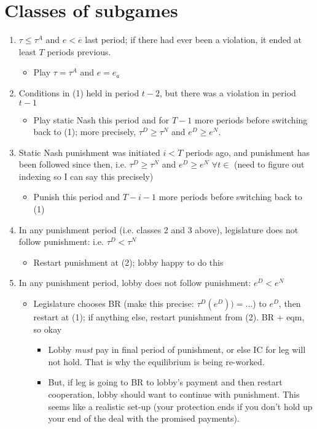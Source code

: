 \documentclass[12pt]{article}
\newcommand{\ov}{\overline}
\begin{document}
\section{Classes of subgames}
\begin{enumerate}
	\item $\tau \leq \tau^A$ and $e < \ov{e}$ last period; if there had ever been a violation, it ended at least $T$ periods previous.
		\begin{itemize}
			\item Play $\tau = \tau^A$ and $e=e_a$
		\end{itemize}
	\item Conditions in (1) held in period $t-2$, but there was a violation in period $t-1$
		\begin{itemize}
			\item Play static Nash this period and for $T-1$ more periods before switching back to (1); more precisely, $\tau^D \geq \tau^N$ and $e^D \geq e^N$.
		\end{itemize}
	\item Static Nash punishment was initiated $i<T$ periods ago, and punishment has been followed since then, i.e. $\tau^D \geq \tau^N$ and $e^D \geq e^N$ $\forall t \in$ (need to figure out indexing so I can say this precisely)
		\begin{itemize}
			\item Punish this period and $T-i-1$ more periods before switching back to (1)
		\end{itemize}
	\item In any punishment period (i.e. classes 2 and 3 above), legislature does not follow punishment: i.e. $\tau^D < \tau^N$
		\begin{itemize}
			\item Restart punishment at (2); lobby happy to do this
		\end{itemize}
	\item In any punishment period, lobby does not follow punishment: $e^D < e^N$
		\begin{itemize}
			\item Legislature chooses BR (make this precise: $\tau^D(e^D)) = ...$) to $e^D$, then restart at (1); if anything else, restart punishment from (2). BR + eqm, so okay
				\begin{itemize}
					\item Lobby \textit{must} pay in final period of punishment, or else IC for leg will not hold. That is why the equilibrium is being re-worked.
					\item But, if leg is going to BR to lobby's payment and then restart cooperation, lobby should want to continue with punishment. This seems like a realistic set-up (your protection ends if you don't hold up your end of the deal with the promised payments).
				\end{itemize}
		\end{itemize}
\end{enumerate}
\end{document}
